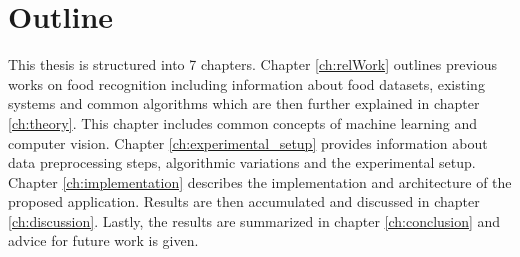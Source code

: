 \section{Outline}
This thesis is structured into 7 chapters. Chapter \ref{ch:relWork} outlines previous works on food recognition including information about food datasets, existing systems and common algorithms which are then further explained in chapter \ref{ch:theory}. This chapter includes common concepts of machine learning and computer vision. Chapter \ref{ch:experimental_setup} provides information about data preprocessing steps, algorithmic variations and the experimental setup. Chapter \ref{ch:implementation} describes the implementation and architecture of the proposed application. Results are then accumulated and discussed in chapter \ref{ch:discussion}. Lastly, the results are summarized in chapter \ref{ch:conclusion} and advice for future work is given.
